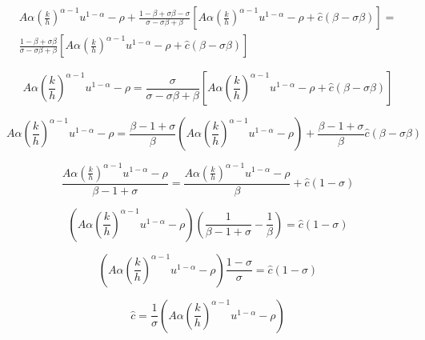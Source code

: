	\begin{equation*}
		\begin{split}
			A\alpha \left(\frac{k}{h}\right)^{\alpha-1}u^{1- \alpha}-\rho+\frac{1-\beta+\sigma\beta-\sigma}{\sigma-\sigma\beta+\beta}\left[A\alpha \left(\frac{k}{h}\right)^{\alpha-1}u^{1- \alpha}-\rho+\hat{c}(\beta-\sigma\beta)\right]=\\
			\frac{1-\beta+\sigma\beta}{\sigma-\sigma\beta+\beta}\left[A\alpha \left(\frac{k}{h}\right)^{\alpha-1}u^{1- \alpha}-\rho+\hat{c}(\beta-\sigma\beta)\right]
		\end{split}
	\end{equation*}


	\begin{equation*}
		A\alpha \left(\frac{k}{h}\right)^{\alpha-1}u^{1- \alpha}-\rho=\frac{\sigma}{\sigma-\sigma\beta+\beta}\left[A\alpha \left(\frac{k}{h}\right)^{\alpha-1}u^{1- \alpha}-\rho+\hat{c}(\beta-\sigma\beta)\right]
	\end{equation*}


	\begin{equation*}
		A\alpha \left(\frac{k}{h}\right)^{\alpha-1}u^{1- \alpha}-\rho=\frac{\beta-1+\sigma}{\beta}\left(A\alpha \left(\frac{k}{h}\right)^{\alpha-1}u^{1- \alpha}-\rho\right)+\frac{\beta-1+\sigma}{\beta}\hat{c}(\beta-\sigma\beta)
	\end{equation*}


	\begin{equation*}
		\frac{A\alpha \left(\frac{k}{h}\right)^{\alpha-1}u^{1- \alpha}-\rho}{\beta-1+\sigma}=\frac{A\alpha \left(\frac{k}{h}\right)^{\alpha-1}u^{1- \alpha}-\rho}{\beta}+\hat{c}(1-\sigma)
	\end{equation*}


	\begin{equation*}
		\left(A\alpha \left(\frac{k}{h}\right)^{\alpha-1}u^{1- \alpha}-\rho\right)\left(\frac{1}{\beta-1+\sigma}-\frac{1}{\beta}\right)=\hat{c}(1-\sigma)
	\end{equation*}


	\begin{equation*}
		\left(A\alpha \left(\frac{k}{h}\right)^{\alpha-1}u^{1- \alpha}-\rho\right)\frac{1-\sigma}{\sigma}=\hat{c}(1-\sigma)
	\end{equation*}


	\begin{equation}
		\boxed{\hat{c}=\frac{1}{\sigma}\left(A\alpha \left(\frac{k}{h}\right)^{\alpha-1}u^{1- \alpha}-\rho\right)}\label{KRRGG}
	\end{equation}


